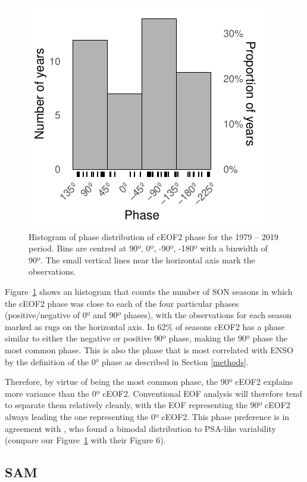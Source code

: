 \documentclass[pdflatex,sn-basic]{sn-jnl}
\theoremstyle{thmstyleone}%
\theoremstyle{thmstyletwo}%
\theoremstyle{thmstylethree}%
\begin{document}
\begin{figure}
\centering
\includegraphics{../figures/phase-histogram-1.pdf}
\caption{\label{fig:phase-histogram}Histogram of phase distribution of cEOF2 phase for the 1979 -- 2019 period. Bins are centred at 90º, 0º, -90º, -180º with a binwidth of 90º. The small vertical lines near the horizontal axis mark the observations.}
\end{figure}

Figure~\ref{fig:phase-histogram} shows an histogram that counts the number of SON seasons in which the cEOF2 phase was close to each of the four particular phases (positive/negative of 0º and 90º phases), with the observations for each season marked as rugs on the horizontal axis.
In 62\% of seasons cEOF2 has a phase similar to either the negative or positive 90º phase, making the 90º phase the most common phase.
This is also the phase that is most correlated with ENSO by the definition of the 0° phase as described in Section \ref{methods}.~

Therefore, by virtue of being the most common phase, the 90º cEOF2 explains more variance than the 0º cEOF2.
Conventional EOF analysis will therefore tend to separate them relatively cleanly, with the EOF representing the 90º cEOF2 always leading the one representing the 0º cEOF2.
This phase preference is in agreement with \citet{irving2016}, who found a bimodal distribution to PSA-like variability (compare our Figure~\ref{fig:phase-histogram} with their Figure 6).

\hypertarget{sam}{%
\subsection{SAM}\label{sam}}
\end{document}
